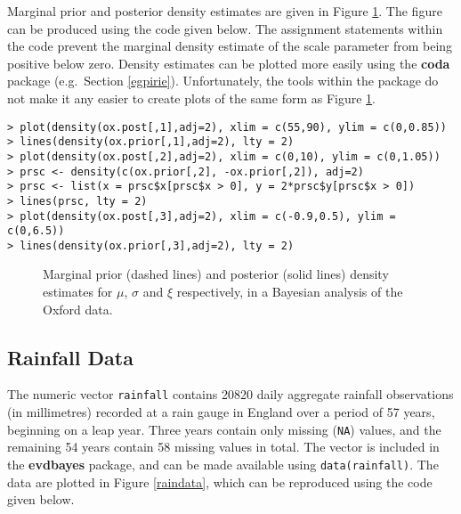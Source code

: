 \documentclass[11pt,a4paper]{article}
\begin{document}
Marginal prior and posterior density estimates are given in Figure
\ref{oxdens}.  The figure can be produced using the code given below.
The assignment statements within the code prevent the marginal density
estimate of the scale parameter from being positive below zero.
Density estimates can be plotted more easily using the \textbf{coda}
package (e.g.\ Section \ref{egpirie}).  Unfortunately, the tools
within the package do not make it any easier to create plots of the
same form as Figure \ref{oxdens}.

\begin{verbatim}
> plot(density(ox.post[,1],adj=2), xlim = c(55,90), ylim = c(0,0.85))
> lines(density(ox.prior[,1],adj=2), lty = 2)
> plot(density(ox.post[,2],adj=2), xlim = c(0,10), ylim = c(0,1.05))
> prsc <- density(c(ox.prior[,2], -ox.prior[,2]), adj=2)
> prsc <- list(x = prsc$x[prsc$x > 0], y = 2*prsc$y[prsc$x > 0])
> lines(prsc, lty = 2)
> plot(density(ox.post[,3],adj=2), xlim = c(-0.9,0.5), ylim = c(0,6.5))
> lines(density(ox.prior[,3],adj=2), lty = 2)
\end{verbatim}

\begin{figure}
\begin{center}
   \vspace{-1.5cm}
  \hspace{0cm} 
  \hspace{0cm} 
\end{center}
\caption{Marginal prior (dashed lines) and posterior (solid lines)
  density estimates for $\mu$, $\sigma$ and $\xi$ respectively, in a
  Bayesian analysis of the Oxford data.}
\label{oxdens}
\end{figure}

\subsection{Rainfall Data}
\label{egrain}

The numeric vector \verb+rainfall+ contains 20820 daily aggregate
rainfall observations (in millimetres) recorded at a rain gauge in
England over a period of 57 years, beginning on a leap year.  Three
years contain only missing (\verb+NA+) values, and the remaining 54
years contain 58 missing values in total.  The vector is included in
the \textbf{evdbayes} package, and can be made available using
\verb+data(rainfall)+.  The data are plotted in Figure \ref{raindata},
which can be reproduced using the code given below.
\end{document}
